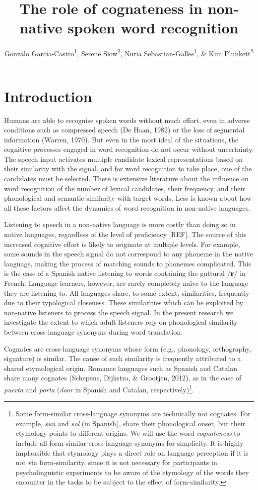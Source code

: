 \documentclass[
  english,
  man,floatsintext]{apa6}
\title{The role of cognateness in non-native spoken word recognition}
\author{Gonzalo Garcia-Castro\textsuperscript{1}, Serene Siow\textsuperscript{2}, Nuria Sebastian-Galles\textsuperscript{1}, \& Kim Plunkett\textsuperscript{2}}
\date{}
\affiliation{\vspace{0.5cm}\textsuperscript{1} Center for Brain and Cognition, Universitat Pompeu Fabra\\\textsuperscript{2} Department of Experimental Psychology, University of Oxford}
\begin{document}
\maketitle

\hypertarget{introduction}{%
\section{Introduction}\label{introduction}}

Humans are able to recognise spoken words without much effort, even in adverse conditions such as compressed speech (De Haan, 1982) or the loss of segmental information (Warren, 1970). But even in the most ideal of the situations, the cognitive processes engaged in word recognition do not occur without uncertainty. The speech input activates multiple candidate lexical representations based on their similarity with the signal, and for word recognition to take place, one of the candidates must be selected. There is extensive literature about the influence on word recognition of the number of lexical candidates, their frequency, and their phonological and semantic similarity with target words. Less is known about how all these factors affect the dynamics of word recognition in non-native languages.

Listening to speech in a non-native language is more costly than doing so in native languages, regardless of the level of proficiency {[}REF{]}. The source of this increased cognitive effort is likely to originate at multiple levels. For example, some sounds in the speech signal do not correspond to any phoneme in the native language, making the process of matching sounds to phonemes complicated. This is the case of a Spanish native listening to words containing the guttural /ʁ/ in French. Language learners, however, are rarely completely naïve to the language they are listening to. All languages share, to some extent, similarities, frequently due to their typological closeness. These similarities which can be exploited by non-native listeners to process the speech signal. In the present research we investigate the extent to which adult listeners rely on phonological similarity between cross-language synonyms during word translation.

Cognates are cross-language synonyms whose form (e.g., phonology, orthography, signature) is similar. The cause of such similarity is frequently attributed to a shared etymological origin. Romance languages such as Spanish and Catalan share many cognates (Schepens, Dijkstra, \& Grootjen, 2012), as in the case of \emph{puerta} and \emph{porta} (\emph{door} in Spanish and Catalan, respectively)\footnote{Some form-similar cross-language synonyms are technically not cognates. For example, \emph{sun} and \emph{sol} (in Spanish), share their phonological onset, but their etymology points to different origins. We will use the word \emph{cognateness} to include all form-similar cross-language synonyms for simplicity. It is highly implausible that etymology plays a direct role on language perception if it is not via form-similarity, since it is not necessary for participants in psycholinguistic experiments to be aware of the etymology of the words they encounter in the tasks to be subject to the effect of form-similarity.}.
\end{document}
